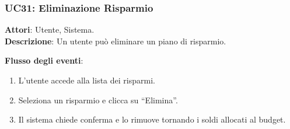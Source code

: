 \subsubsection{UC31: Eliminazione Risparmio}
\textbf{Attori}: Utente, Sistema. \\
\textbf{Descrizione}: Un utente può eliminare un piano di risparmio.

\textbf{Flusso degli eventi}:
\begin{enumerate}
    \item L’utente accede alla lista dei risparmi.
    \item Seleziona un risparmio e clicca su ``Elimina''.
    \item Il sistema chiede conferma e lo rimuove tornando i soldi allocati al budget.
\end{enumerate}

